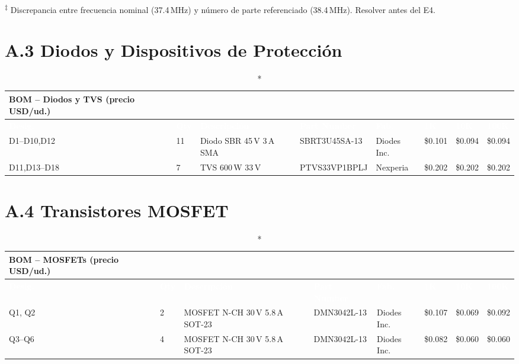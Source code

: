 \noindent\textsuperscript{‡} Discrepancia entre frecuencia nominal (37.4\,MHz) y
número de parte referenciado (38.4\,MHz). Resolver antes del E4.

\section*{A.3 Diodos y Dispositivos de Protección}

\begin{longtable}{C{1.5cm} C{0.5cm} L{2.8cm} L{3.0cm} L{1.8cm} R{1.1cm} R{1.1cm} R{1.1cm}}
  \caption*{BOM -- Diodos y TVS (precio USD/ud.)}\\
  \toprule
  \textcolor{white}{\textbf{Desig.}} &
  \textcolor{white}{\textbf{Qty}} &
  \textcolor{white}{\textbf{Descripción}} &
  \textcolor{white}{\textbf{Part Number}} &
  \textcolor{white}{\textbf{Fab.}} &
  \textcolor{white}{\textbf{1K}} &
  \textcolor{white}{\textbf{10K}} &
  \textcolor{white}{\textbf{100K}} \\
  \midrule
  \endfirsthead
  \midrule \endhead \bottomrule \endfoot
  D1--D10,D12 & 11 & Diodo SBR 45\,V 3\,A SMA     & SBRT3U45SA-13  & Diodes Inc.& \$0.101 & \$0.094 & \$0.094 \\
  D11,D13--D18 & 7 & TVS 600\,W 33\,V              & PTVS33VP1BPLJ  & Nexperia  & \$0.202 & \$0.202 & \$0.202 \\
\end{longtable}

\section*{A.4 Transistores MOSFET}

\begin{longtable}{C{1.2cm} C{0.5cm} L{2.8cm} L{3.0cm} L{1.8cm} R{1.1cm} R{1.1cm} R{1.1cm}}
  \caption*{BOM -- MOSFETs (precio USD/ud.)}\\
  \toprule
  \textcolor{white}{\textbf{Desig.}} &
  \textcolor{white}{\textbf{Qty}} &
  \textcolor{white}{\textbf{Descripción}} &
  \textcolor{white}{\textbf{Part Number}} &
  \textcolor{white}{\textbf{Fab.}} &
  \textcolor{white}{\textbf{1K}} &
  \textcolor{white}{\textbf{10K}} &
  \textcolor{white}{\textbf{100K}} \\
  \midrule
  \endfirsthead
  \midrule \endhead \bottomrule \endfoot
  Q1, Q2    & 2 & MOSFET N-CH 30\,V 5.8\,A SOT-23 & DMN3042L-13 & Diodes Inc. & \$0.107 & \$0.069 & \$0.092 \\
  Q3--Q6    & 4 & MOSFET N-CH 30\,V 5.8\,A SOT-23 & DMN3042L-13 & Diodes Inc. & \$0.082 & \$0.060 & \$0.060 \\
\end{longtable}

